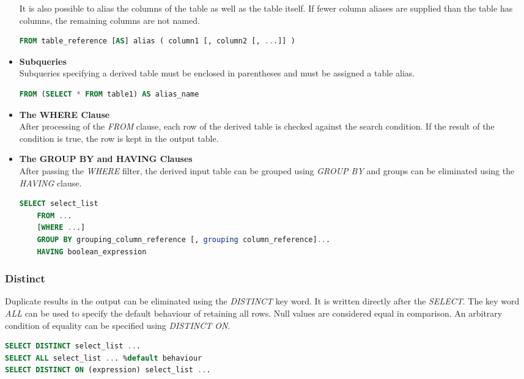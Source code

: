 \begin{addmargin}{-.5cm}
\begin{itemize}
It is also possible to alias the columns of the table as well as the table itself. If fewer column aliases are supplied than the table has columns, the remaining columns are not named.
\begin{lstlisting}[language=SQL]
FROM table_reference [AS] alias ( column1 [, column2 [, ...]] )
\end{lstlisting}
\item \textbf{Subqueries}\\
Subqueries specifying a derived table must be enclosed in parentheses and must be assigned a table alias.
\begin{lstlisting}[language=SQL]
FROM (SELECT * FROM table1) AS alias_name
\end{lstlisting}
\item \textbf{The WHERE Clause}\\
After processing of the \textit{FROM} clause, each row of the derived table is checked against the search condition. If the result of the condition is true, the row is kept in the output table. 
\item \textbf{The GROUP BY and HAVING Clauses}\\
After passing the \textit{WHERE} filter, the derived input table can be grouped using \textit{GROUP BY} and groups can be eliminated using the \textit{HAVING} clause.
\begin{lstlisting}[language=SQL]
SELECT select_list
	FROM ...
	[WHERE ...]
	GROUP BY grouping_column_reference [, grouping column_reference]...
	HAVING boolean_expression
\end{lstlisting}
\end{itemize}
\end{addmargin}

\subsubsection{Distinct}
Duplicate results in the output can be eliminated using the \textit{DISTINCT} key word. It is written directly after the \textit{SELECT}. The key word \textit{ALL} can be used to specify the default behaviour of retaining all rows. Null values are considered equal in comparison. An arbitrary condition of equality can be specified using \textit{DISTINCT ON}.
\begin{lstlisting}[language=SQL]
SELECT DISTINCT select_list ...
SELECT ALL select_list ... %default behaviour
SELECT DISTINCT ON (expression) select_list ...
\end{lstlisting}

